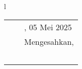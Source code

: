 \begin{center}
	\begin{tabular}{l}
		\begin{tabular}{lll}
			                        &                & \kota, 05 Mei 2025    \\
			                        &                & Mengesahkan,             \\
			                        &                &                          \\
			\bo{PLH. Dekan}              & \hspace{2cm}   & \bo{Ketua Program Studi} \\
			\vspace{0.4cm}          & \vspace{0.4cm} & \vspace{0.4cm}           \\
			\bo{\underline{\dekan}} &                &
			\bo{\underline{\kaprodi}}                                           \\
			\bo{NIP. \dekannip}     &                & \bo{NIP. \kaprodinip}
		\end{tabular} \\ \\
\end{tabular}
\end{center}

